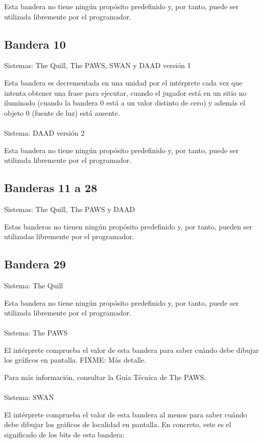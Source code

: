 \documentclass[11pt, a5paper]{article}
\newcommand{\quill}{\textsf{The Quill}\xspace}
\newcommand{\paw}{\textsf{The PAWS}\xspace}
\newcommand{\swan}{\textsf{SWAN}\xspace}
\newcommand{\daad}{\textsf{DAAD}\xspace}
\newcommand{\sistema}[1]{\noindent Sistema: #1 \nopagebreak}
\newcommand{\sistemas}[1]{\noindent Sistemas: #1 \nopagebreak}
\begin{document}
Esta bandera no tiene ningún propósito predefinido y, por tanto, puede ser utilizada libremente por el programador.

\subsection{Bandera 10}

\sistemas{\quill, \paw, \swan y \daad versión 1}

Esta bandera es decrementada en una unidad por el intérprete cada vez que intenta obtener una frase para ejecutar, cuando el jugador está en un sitio no iluminado (cuando la bandera 0 está a un valor distinto de cero) y además el objeto 0 (fuente de luz) está ausente.
\\\ \\
\sistema{\daad versión 2}

Esta bandera no tiene ningún propósito predefinido y, por tanto, puede ser utilizada libremente por el programador.

\subsection{Banderas 11 a 28}

\sistemas{\quill, \paw y \daad}

Estas banderas no tienen ningún propósito predefinido y, por tanto, pueden ser utilizadas libremente por el programador.

\subsection{Bandera 29}\label{flag29}

\sistema{\quill}

Esta bandera no tiene ningún propósito predefinido y, por tanto, puede ser utilizada libremente por el programador.
\\\ \\
\sistema{\paw}

El intérprete comprueba el valor de esta bandera para saber cuándo debe dibujar los gráficos en pantalla. FIXME: Más detalle.

Para más información, consultar la Guía Técnica de \paw \cite{PawsZX}.
\\\ \\
\sistema{\swan}

El intérprete comprueba el valor de esta bandera al menos para saber cuándo debe dibujar los gráficos de localidad en pantalla. En concreto, este es el significado de los bits de esta bandera:
\end{document}
